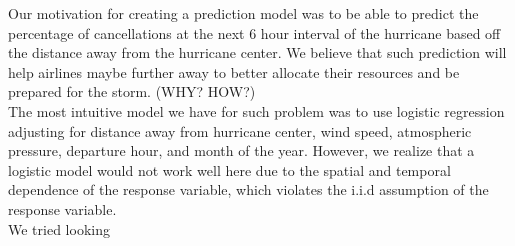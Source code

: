 
Our motivation for creating a prediction model was to be able to predict the percentage of cancellations at the next 6 hour interval of the hurricane based off the distance away from the hurricane center. We believe that such prediction will help airlines maybe further away to better allocate their resources and be prepared for the storm. (WHY? HOW?) \\

The most intuitive model we have for such problem was to use logistic regression adjusting for distance away from hurricane center, wind speed, atmospheric pressure, departure hour, and month of the year. However, we realize that a logistic model would not work well here due to the spatial and temporal dependence of the response variable, which violates the i.i.d assumption of the response variable. \\ 

We tried looking 